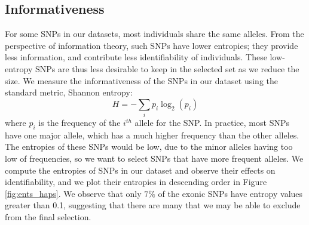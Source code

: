 \documentclass[14pt, oneside]{article}   	%
\begin{document}
\subsection{Informativeness}\label{sec:inf}
For some SNPs in our datasets, most individuals share the same alleles.
From the perspective of information theory, such SNPs have lower entropies;
they provide less information, and contribute less identifiability of individuals.
These low-entropy SNPs are thus less desirable to keep in the selected set as we reduce the size.
We measure the informativeness of the SNPs in our dataset using the standard metric, Shannon entropy:
\[
H = - \sum_{i}{p_i \log_2(p_i)}
\]
where $p_i$ is the frequency of the $i^{th}$ allele for the SNP.
In practice, most SNPs have one major allele, which has a much higher frequency than the other alleles.
The entropies of these SNPs would be low, due to the minor alleles having too low of frequencies,
so we want to select SNPs that have more frequent alleles.
We compute the entropies of SNPs in our dataset and observe their effects on identifiability,
and we plot their entropies in descending order in Figure \ref{fig:ents_haps}.
We observe that only $7\%$ of the exonic SNPs have entropy values greater than 0.1,
suggesting that there are many that we may be able to exclude from the final selection.

%
\end{document}
